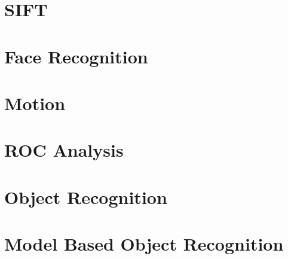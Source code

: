 \documentclass{article}
\begin{document}
	\section{SIFT}

	\section{Face Recognition}

	\section{Motion}

	\section{ROC Analysis}

	\section{Object Recognition}

	\section{Model Based Object Recognition}
	\newpage
	\listoffigures
	\printindex
\end{document}
